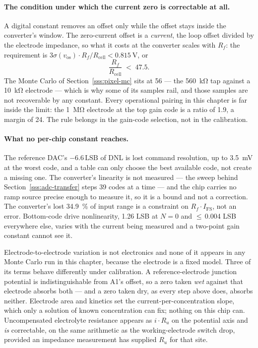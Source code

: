 \paragraph{The condition under which the current zero is correctable at all.}
A digital constant removes an offset only while the offset stays inside the
converter's window. The zero-current offset is a \emph{current}, the loop offset
divided by the electrode impedance, so what it costs at the converter scales
with \(R_f\): the requirement is \(3\sigma(v_{\mathrm{os}}) \cdot R_f /
R_{\mathrm{cell}} < \SI{0.815}{\volt}\), or
\[
  \frac{R_f}{R_{\mathrm{cell}}} \;<\; 47.5 .
\]
The Monte Carlo of Section~\ref{sss:pixel-mc} sits at 56 --- the
\SI{560}{\kilo\ohm} tap against a \SI{10}{\kilo\ohm} electrode --- which is why
some of its samples rail, and those samples are not recoverable by any constant.
Every operational pairing in this chapter is far inside the limit: the
\SI{1}{\mega\ohm} electrode at the top gain code is a ratio of 1.9, a margin of
\num{24}. The rule belongs in the gain-code selection, not in the calibration.

\paragraph{What no per-chip constant reaches.} The reference DAC's
\(-6.6\,\mathrm{LSB}\) of DNL is lost command resolution, up to
\SI{3.5}{\milli\volt} at the worst code, and a table can only choose the best
available code, not create a missing one. The converter's linearity is not
measured --- the sweep behind Section~\ref{sss:adc-transfer} steps 39 codes at a
time --- and the chip carries no ramp source precise enough to measure it, so it
is a bound and not a correction. The converter's lost \SI{34.9}{\percent} of
input range is a constraint on \(R_f \cdot I_{\mathrm{FS}}\), not an error.
Bottom-code drive nonlinearity, 1.26 LSB at \(N = 0\) and \(\leq\)\,0.004 LSB
everywhere else, varies with the current being measured and a two-point gain
constant cannot see it.

Electrode-to-electrode variation is not electronics and none of it appears in
any Monte Carlo run in this chapter, because the electrode is a fixed model.
Three of its terms behave differently under calibration. A reference-electrode
junction potential is indistinguishable from A1's offset, so a zero taken
\emph{wet} against that electrode absorbs both --- and a zero taken dry, as
every step above does, absorbs neither. Electrode area and kinetics set the
current-per-concentration slope, which only a solution of known concentration
can fix; nothing on this chip can. Uncompensated electrolyte resistance appears
as \(i\!\cdot\!R_u\) on the potential axis and \emph{is} correctable, on the same
arithmetic as the working-electrode switch drop, provided an impedance
measurement has supplied \(R_u\) for that site.

